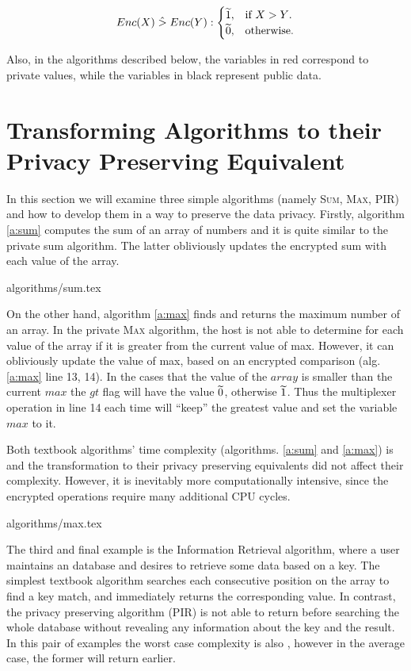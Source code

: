 \begin{equation}\label{eq:gt}
  Enc(X) \;\hat{>}\; Enc(Y) :\begin{cases}
    \widetilde{1}, & \text{if $X > Y$}.\\
    \widetilde{0}, & \text{otherwise}.
  \end{cases}
\end{equation}

Also, in the algorithms described below, the variables in {\color{darkred} red} correspond to private values, while the variables in black represent public data.


\section{Transforming Algorithms to their Privacy Preserving Equivalent}\label{s:simple-algorithms}
In this section we will examine three simple algorithms (namely {\textsc{Sum}, \textsc{Max}, \textsc{PIR}}) and how to develop them in a way to preserve the data privacy.
Firstly, algorithm \ref{a:sum} computes the sum of an array of numbers and it is quite similar to the private sum algorithm.
The latter obliviously updates the encrypted sum with each value of the array.

{algorithms/sum.tex}


On the other hand, algorithm \ref{a:max} finds and returns the maximum number of an array.
In the private {\textsc{Max}} algorithm, the host is not able to determine for each value of the array if it is greater from the current value of max.
However, it can obliviously update the value of max, based on an encrypted comparison (alg. \ref{a:max} line 13, 14).
In the cases that the value of the $array$ is smaller than the current $max$ the $gt$ flag will have the value $\widetilde{0}$, otherwise $\widetilde{1}$.
Thus the multiplexer operation in line 14 each time will ``keep'' the greatest value and set the variable $max$ to it.

Both textbook algorithms' time complexity (algorithms. \ref{a:sum} and \ref{a:max}) is  and the transformation to their privacy preserving equivalents did not affect their complexity.
However, it is inevitably more computationally intensive, since the encrypted operations require many additional CPU cycles.

{algorithms/max.tex}


The third and final example is the Information Retrieval algorithm, where a user maintains an database and desires to retrieve some data based on a key.
The simplest textbook algorithm searches each consecutive position on the array to find a key match, and immediately returns the corresponding value.
In contrast, the privacy preserving algorithm (PIR) is not able to return before searching the whole database without revealing any information about the key and the result.
In this pair of examples the worst case complexity is also , however in the average case, the former will return earlier.


